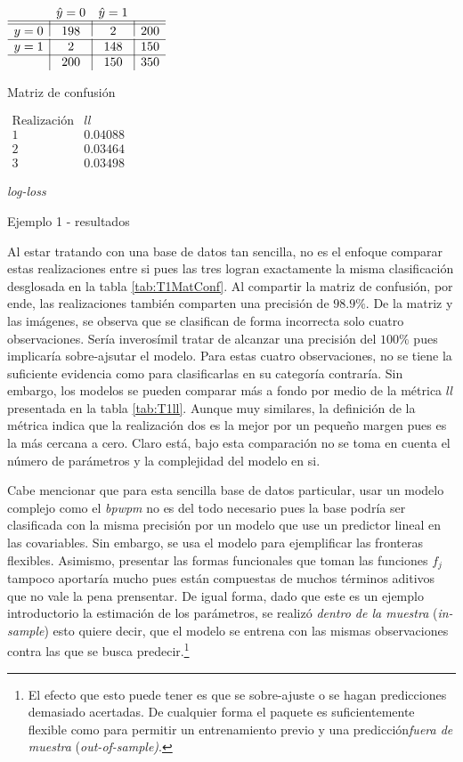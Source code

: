 \documentclass[../Main/Main.tex]{subfiles}
\begin{document}
\begin{table}[h]
\begin{subtable}[t]{0.45\textwidth}
	\centering
	$\begin{array}{l|c|c|l} ~ & \hat{y} = 0 & \hat{y} = 1 & ~ \\ \hline\hline y = 0 & 198 & 2 & 200 \\ \hline y = 1 & 2 & 148 & 150 \\ \hline ~ & 200 & 150 & 350 \end{array}$
	\caption{Matriz de confusión}
	\label{tab:T1MatConf}
\end{subtable}
\hfill
\begin{subtable}[t]{0.45\textwidth}
	\centering
	$\begin{array}{c|c}
		\text{Realización} & ll \\ \hline\hline
		1 & 0.04088 \\
		2 & 0.03464 \\
		3 & 0.03498
	\end{array}$
	\caption{\textit{log-loss}}
	\label{tab:T1ll}
\end{subtable}
\caption{Ejemplo 1 - resultados}
\label{tab:T1Resultados}
\end{table}
Al estar tratando con una base de datos tan sencilla, no es el enfoque comparar estas realizaciones entre si pues las tres logran exactamente la misma clasificación desglosada en la tabla \ref{tab:T1MatConf}. Al compartir la matriz de confusión, por ende, las realizaciones también comparten una precisión de $98.9\%$. De la matriz y las imágenes, se observa que se clasifican de forma incorrecta solo cuatro observaciones. Sería inverosímil tratar de alcanzar una precisión del $100\%$ pues implicaría sobre-ajsutar el modelo. Para estas cuatro observaciones, no se tiene la suficiente evidencia como para clasificarlas en su categoría contraría. Sin embargo, los modelos se pueden comparar más a fondo por medio de la métrica $ll$ presentada en la tabla \ref{tab:T1ll}. Aunque muy similares, la definición de la métrica indica que la realización dos es la mejor por un pequeño margen pues es la más cercana a cero. Claro está, bajo esta comparación no se toma en cuenta el número de parámetros y la complejidad del modelo en si.

Cabe mencionar que para esta sencilla base de datos particular, usar un modelo complejo como el \textit{bpwpm} no es del todo necesario pues la base podría ser clasificada con la misma precisión por un modelo que use un predictor lineal en las covariables. Sin embargo, se usa el modelo para ejemplificar las fronteras flexibles. Asimismo, presentar las formas funcionales que toman las funciones $f_j$ tampoco aportaría mucho pues están compuestas de muchos términos aditivos que no vale la pena prensentar. De igual forma, dado que este es un ejemplo introductorio la estimación de los parámetros, se realizó \textit{dentro de la muestra} (\textit{in-sample}) esto quiere decir, que el modelo se entrena con las mismas observaciones contra las que se busca predecir.\footnote{El efecto que esto puede tener es que se sobre-ajuste o se hagan predicciones demasiado acertadas. De cualquier forma el paquete es suficientemente flexible como para permitir un entrenamiento previo y una predicción\textit{fuera de muestra} (\textit{out-of-sample)}.} 
\end{document}
